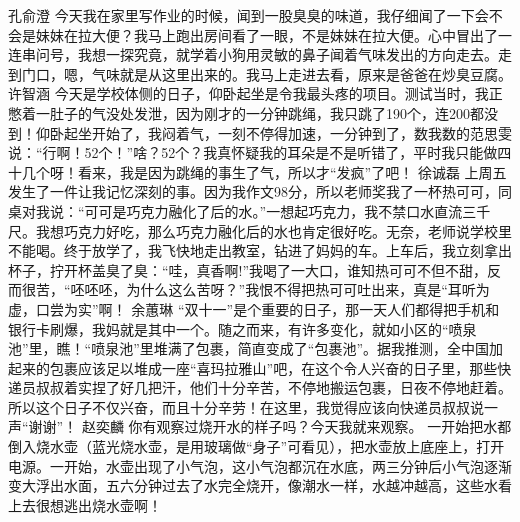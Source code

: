 {}\markdownRendererInterblockSeparator
{}孔俞澄\markdownRendererInterblockSeparator
{}今天我在家里写作业的时候，闻到一股臭臭的味道，我仔细闻了一下会不会是妹妹在拉大便？我马上跑出房间看了一眼，不是妹妹在拉大便。心中冒出了一连串问号，我想一探究竟，就学着小狗用灵敏的鼻子闻着气味发出的方向走去。走到门口，嗯，气味就是从这里出来的。我马上走进去看，原来是爸爸在炒臭豆腐。\markdownRendererInterblockSeparator
{}\markdownRendererInterblockSeparator
{}许智涵\markdownRendererInterblockSeparator
{}今天是学校体侧的日子，仰卧起坐是令我最头疼的项目。测试当时，我正憋着一肚子的气没处发泄，因为刚才的一分钟跳绳，我只跳了190个，连200都没到！仰卧起坐开始了，我闷着气，一刻不停得加速，一分钟到了，数我数的范思雯说：“行啊！52个！”啥？52个？我真怀疑我的耳朵是不是听错了，平时我只能做四十几个呀！看来，我是因为跳绳的事生了气，所以才“发疯”了吧！ \markdownRendererInterblockSeparator
{}\markdownRendererInterblockSeparator
{}徐诚磊\markdownRendererInterblockSeparator
{}上周五发生了一件让我记忆深刻的事。因为我作文98分，所以老师奖我了一杯热可可，同桌对我说：“可可是巧克力融化了后的水。”一想起巧克力，我不禁口水直流三千尺。我想巧克力好吃，那么巧克力融化后的水也肯定很好吃。无奈，老师说学校里不能喝。终于放学了，我飞快地走出教室，钻进了妈妈的车。上车后，我立刻拿出杯子，拧开杯盖臭了臭：“哇，真香啊!”我喝了一大口，谁知热可可不但不甜，反而很苦，“呸呸呸，为什么这么苦呀？”我恨不得把热可可吐出来，真是“耳听为虚，口尝为实”啊！\markdownRendererInterblockSeparator
{}\markdownRendererInterblockSeparator
{}余蕙琳\markdownRendererInterblockSeparator
{}“双十一”是个重要的日子，那一天人们都得把手机和银行卡刷爆，我妈就是其中一个。随之而来，有许多变化，就如小区的“喷泉池”里，瞧！“喷泉池”里堆满了包裹，简直变成了“包裹池”。据我推测，全中国加起来的包裹应该足以堆成一座“喜玛拉雅山”吧，在这个令人兴奋的日子里，那些快递员叔叔着实捏了好几把汗，他们十分辛苦，不停地搬运包裹，日夜不停地赶着。所以这个日子不仅兴奋，而且十分辛劳！在这里，我觉得应该向快递员叔叔说一声“谢谢”！\markdownRendererInterblockSeparator
{}\markdownRendererInterblockSeparator
{}赵奕麟\markdownRendererInterblockSeparator
{}你有观察过烧开水的样子吗？今天我就来观察。\markdownRendererInterblockSeparator
{}一开始把水都倒入烧水壶（蓝光烧水壶，是用玻璃做“身子”可看见），把水壶放上底座上，打开电源。一开始，水壶出现了小气泡，这小气泡都沉在水底，两三分钟后小气泡逐渐变大浮出水面，五六分钟过去了水完全烧开，像潮水一样，水越冲越高，这些水看上去很想逃出烧水壶啊！\markdownRendererInterblockSeparator
